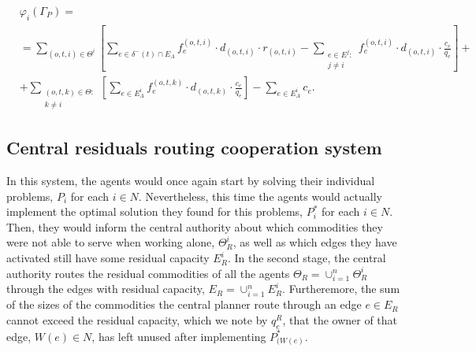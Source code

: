 \documentclass[authoryear]{elsarticle}
\begin{document}
\begin{equation}
    \begin{split}
    & \varphi_i(\Gamma_P) =\label{eq:PartialCooperationPayoff} \\
    & = \sum_{(o,t,i)\in \Theta^i} \left[ \sum_{e \in \delta^-(t)\cap E_A} f_e^{(o,t,i)} \cdot d_{(o,t,i)} \cdot r_{(o,t,i)} -  \sum_{\substack{e\in E^j \colon\\ j\not = i}} f_e^{(o,t,i)} \cdot d_{(o,t,i)} \cdot \frac{c_e}{q_e} \right] + \\
    & + \sum_{\substack{(o,t,k) \in \Theta  \colon \\ k \not = i}} \left[\sum_{e \in E_A^i} f_e^{(o,t,k)} \cdot d_{(o,t,k)} \cdot \frac{c_e}{q_e}\right] - \sum_{e \in E_A^i} c_e.
    \end{split}
\end{equation}

\subsection{Central residuals routing cooperation system}

In this system, the agents would once again start by solving their individual problems, $P_i$ for each $i\in N$. Nevertheless, this time the agents  would actually implement the optimal solution they found for this problems, $P_i^*$ for each $i\in N$. Then, they would inform the central authority about which commodities they were not able to serve when working alone, $\Theta_R^i$, as well as which edges they have activated still have some residual capacity $E_R^i$. In the second stage, the central authority routes the residual commodities of all the agents $\Theta_R = \cup_{i=1}^n \Theta_R^i$ through the edges with residual capacity, $E_R=\cup_{i=1}^n E_R^i$. Furtheremore, the sum of the sizes of the commodities the central planner route through an edge $e\in E_R$ cannot exceed the residual capacity, which we note by $q_e^R$, that the owner of that edge, $W(e)\in N$, has left unused after implementing $P_{(W(e)}^*$.
\end{document}
